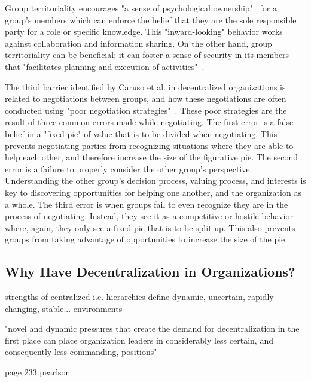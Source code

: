 Group territoriality encourages "a sense of psychological ownership"~\cite{caruso2008boundaries} for a group's members which can enforce the belief that they are the sole responsible party for a role or specific knowledge. This "inward-looking" behavior works against collaboration and information sharing. On the other hand, group territoriality can be beneficial; it can foster a sense of security in its members that "facilitates planning and execution of activities"~\cite{caruso2008boundaries}. 

The third barrier identified by Caruso et al. in decentralized organizations is related to negotiations between groups, and how these negotiations are often conducted using "poor negotiation  strategies"~\cite{caruso2008boundaries}. These poor strategies are the result of three common errors made while negotiating. The first error is a false belief in a "fixed pie" of value that is to be divided when negotiating. This prevents negotiating parties from recognizing situations where they are able to help each other, and therefore increase the size of the figurative pie. The second error is a failure to properly consider the other group's perspective. Understanding the other group's decision process, valuing process, and interests is key to discovering opportunities for helping one another, and the organization as a whole. The third error is when groups fail to even recognize they are in the process of negotiating. Instead, they see it as a competitive or hostile behavior where, again, they only see a fixed pie that is to be split up. This also prevents groups from taking advantage of opportunities to increase the size of the pie.    


\subsection{Why Have Decentralization in Organizations?}
strengths of centralized i.e. hierarchies
define dynamic, uncertain, rapidly changing, stable... environments

"novel and dynamic pressures that create the demand for decentralization in the first place can place organization leaders in considerably less certain, and consequently less commanding, positions"

page 233 pearlson
